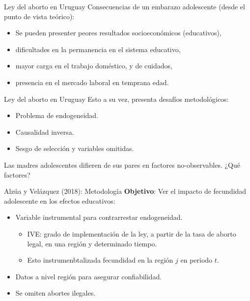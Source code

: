 \documentclass[11pt, aspectratio=169, compress]{beamer}
\begin{document}
\begin{frame}[t]{Ley del aborto en Uruguay}
	Consecuencias de un embarazo adolescente (desde el punto de vista teórico): 
	\begin{itemize}
		\item Se pueden presenter peores resultados socioeconómicos (educativos), 
		\item dificultades en la permanencia en el sistema educativo, 
		\item mayor carga en el trabajo doméstico, y de cuidados, 
		\item presencia en el mercado laboral en temprana edad. 
	\end{itemize}
\end{frame}
\begin{frame}[t]{Ley del aborto en Uruguay}
	Esto a su vez, presenta desafíos metodológicos: 
	\begin{itemize}
		\item Problema de endogeneidad. 
		\item Causalidad inversa. 
		\item Sesgo de selección y variables omitidas. 
	\end{itemize}
	Las madres adolescentes difieren de sus pares en factores no-observables. ¿Qué factores? 
\end{frame}
\begin{frame}[t]{Alzúa y Velázquez (2018): Metodología}
\textbf{Objetivo}: Ver el impacto de fecundidad adolescente en los efectos educativos: 
\begin{itemize}
	\item Variable instrumental para contrarrestar endogeneidad. 
	\begin{itemize}
		\item IVE: grado de implementación de la ley, a partir de la tasa de aborto legal, en una región y determinado tiempo. 
		\item Esto instrumenbtalizada fecundidad en la región $ j $ en periodo $ t $. 
	\end{itemize}
	\item Datos a nivel región para asegurar confiabilidad. 
	\item Se omiten abortes ilegales. 
\end{itemize}
\end{frame}
\end{document}
